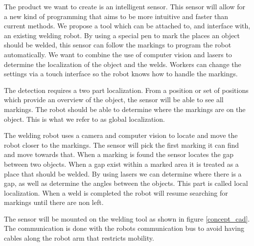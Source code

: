 The product we want to create is an intelligent sensor.
This sensor will allow for a new kind of programming that aims to be more intuitive and faster than current methods.
We propose a tool which can be attached to, and interface with, an existing welding robot. 
By using a special pen to mark the places an object should be welded, this sensor can follow the markings to program the robot automatically.
We want to combine the use of computer vision and lasers to determine the localization of the object and the welds.
Workers can change the settings via a touch interface so the robot knows how to handle the markings. 

The detection requires a two part localization. 
From a position or set of positions which provide an overview of the object, the sensor will be able to see all markings.
The robot should be able to determine where the markings are on the object. 
This is what we refer to as global localization.

The welding robot uses a camera and computer vision to locate and move the robot closer to the markings.
The sensor will pick the first marking it can find and move towards that. 
When a marking is found the sensor locates the gap between two objects. 
When a gap exist within a marked area it is treated as a place that should be welded.
By using lasers we can determine where there is a gap, as well as determine the angles between the objects.
This part is called local localization.
When a weld is completed the robot will resume searching for markings until there are non left.

The sensor will be mounted on the welding tool as shown in figure \ref{concept_cad}. 
The communication is done with the robots communication bus to avoid having cables along the robot arm that restricts mobility.

